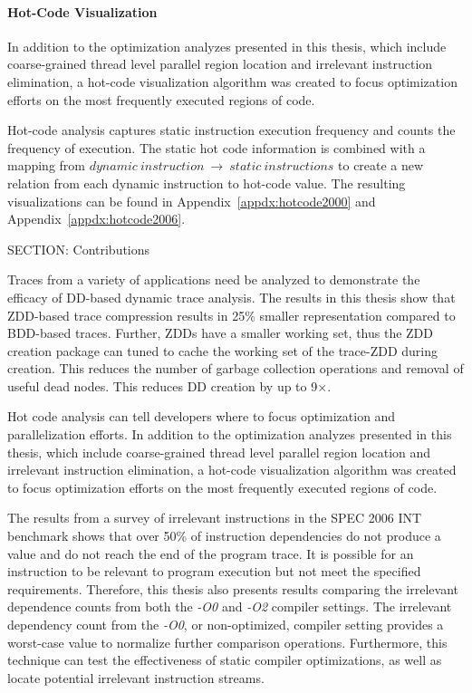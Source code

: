 {\noindent\paragraph{Hot-Code Visualization}

In addition to the optimization analyzes presented in this thesis, which include coarse-grained thread level parallel region location and irrelevant instruction elimination, a hot-code visualization algorithm was created to focus optimization efforts on the most frequently executed regions of code.

Hot-code analysis captures static instruction execution frequency and counts the frequency of execution.  The static hot code information is combined with a mapping from $dynamic\ instruction \ \rightarrow \ static\ instructions$ to create a new relation from each dynamic instruction to hot-code value.  The resulting visualizations can be found in Appendix~\ref{appdx:hotcode2000} and Appendix~\ref{appdx:hotcode2006}.

SECTION: Contributions


Traces from a variety of applications need be analyzed to demonstrate the efficacy of DD-based dynamic trace analysis. The results in this thesis show that ZDD-based trace compression results in 25\% smaller representation compared to BDD-based traces.  Further, ZDDs have a smaller working set, thus the ZDD creation package can tuned to cache the working set of the trace-ZDD during creation.  This reduces the number of garbage collection operations and removal of useful dead nodes. This reduces DD creation by up to 9$\times$.

Hot code analysis can tell developers where to focus optimization and parallelization efforts. In addition to the optimization analyzes presented in this thesis, which include coarse-grained thread level parallel region location and irrelevant instruction elimination, a hot-code visualization algorithm was created to focus optimization efforts on the most frequently executed regions of code.

The results from a survey of irrelevant instructions in the SPEC 2006 INT benchmark shows that over 50\% of instruction dependencies do not produce a value and do not reach the end of the program trace.  It is possible for an instruction to be relevant to program execution but not meet the specified requirements.  Therefore, this thesis also presents results comparing the irrelevant dependence counts from both the \textit{-O0} and \textit{-O2} compiler settings. The irrelevant dependency count from the \textit{-O0}, or non-optimized, compiler setting provides a worst-case value to normalize further comparison operations.  Furthermore, this technique can test the effectiveness of static compiler optimizations, as well as locate potential irrelevant instruction streams.

}
